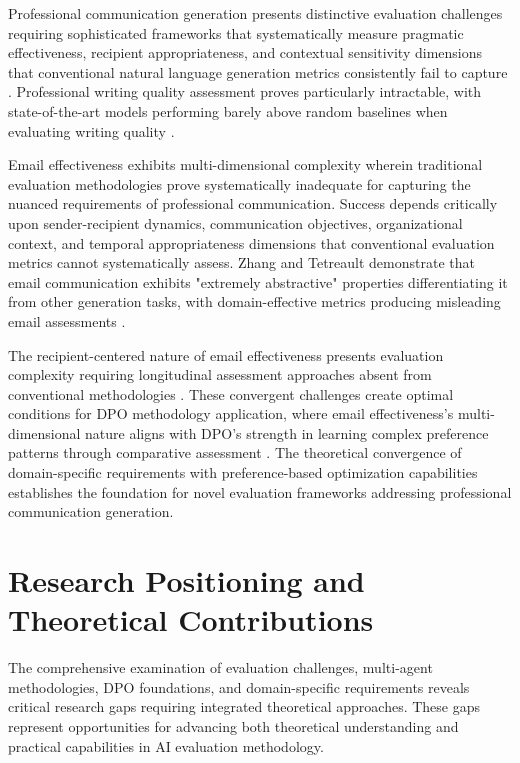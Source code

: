 Professional communication generation presents distinctive evaluation challenges requiring sophisticated frameworks that systematically measure pragmatic effectiveness, recipient appropriateness, and contextual sensitivity dimensions that conventional natural language generation metrics consistently fail to capture \cite{li2024llm_nlg_evaluation}. Professional writing quality assessment proves particularly intractable, with state-of-the-art models performing barely above random baselines when evaluating writing quality \cite{chakrabarty2025writing_quality}.

Email effectiveness exhibits multi-dimensional complexity wherein traditional evaluation methodologies prove systematically inadequate for capturing the nuanced requirements of professional communication. Success depends critically upon sender-recipient dynamics, communication objectives, organizational context, and temporal appropriateness dimensions that conventional evaluation metrics cannot systematically assess. Zhang and Tetreault demonstrate that email communication exhibits "extremely abstractive" properties differentiating it from other generation tasks, with domain-effective metrics producing misleading email assessments \cite{zhang2019email_subject}.

The recipient-centered nature of email effectiveness presents evaluation complexity requiring longitudinal assessment approaches absent from conventional methodologies \cite{gehrmann2022nlg_evaluation_obstacles}. These convergent challenges create optimal conditions for DPO methodology application, where email effectiveness's multi-dimensional nature aligns with DPO's strength in learning complex preference patterns through comparative assessment \cite{kong2025sdpo, wang2024direct_judgement}. The theoretical convergence of domain-specific requirements with preference-based optimization capabilities establishes the foundation for novel evaluation frameworks addressing professional communication generation.

\section{Research Positioning and Theoretical Contributions}

The comprehensive examination of evaluation challenges, multi-agent methodologies, DPO foundations, and domain-specific requirements reveals critical research gaps requiring integrated theoretical approaches. These gaps represent opportunities for advancing both theoretical understanding and practical capabilities in AI evaluation methodology.

